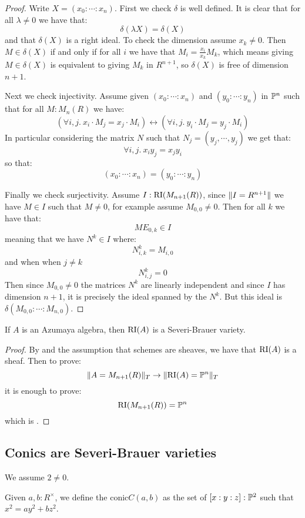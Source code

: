 \begin{proof}
Write $X=(x_0:\cdots:x_n)$. First we check $\delta$ is well defined. It is clear that for all $\lambda\not=0$ we have that:
\[\delta(\lambda X) = \delta(X)\]
and that $\delta(X)$ is a right ideal. To check the dimension assume $x_k\not=0$. Then $M\in\delta(X)$ if and only if for all $i$ we have that $M_i = \frac{x_i}{x_k} M_k$, which means giving $M\in\delta(X)$ is equivalent to giving $M_k$ in $R^{n+1}$, so $\delta(X)$ is free of dimension $n+1$.

Next we check injectivity. Assume given $(x_0:\cdots:x_n)$ and $(y_0:\cdots:y_n)$ in $\mathbb{P}^n$ such that for all $M:M_n(R)$ we have:
\[(\forall i,j.\ x_i\cdot M_j = x_j\cdot M_i) \leftrightarrow (\forall i,j.\ y_i\cdot M_j = y_j\cdot M_i)\]
In particular considering the matrix $N$ such that $N_j = (y_j,\cdots,y_j)$ we get that:
\[\forall i,j.\ x_iy_j=x_jy_i\] 
so that:
\[(x_0:\cdots:x_n) = (y_0:\cdots:y_n)\]

Finally we check surjectivity. Assume $I:\mathrm{RI}(M_{n+1}(R))$, since $\lVert I=R^{n+1} \rVert$ we have $M\in I$ such that $M\not=0$, for example assume $M_{0,0}\not=0$. Then for all $k$ we have that:
\[ME_{0,k}\in I\]
meaning that we have $N^k\in I$ where:
\[N^k_{i,k} = M_{i,0}\]
and when when $j\not=k$
\[N^k_{i,j} = 0\]
Then since $M_{0,0}\not=0$ the matrices $N^k$ are linearly independent and since $I$ has dimension $n+1$, it is precisely the ideal spanned by the $N^k$. But this ideal is $\delta(M_{0,0}:\cdots:M_{n,0})$.
\end{proof}

\begin{lemma}
If $A$ is an Azumaya algebra, then $\mathrm{RI}(A)$ is a Severi-Brauer variety.
\end{lemma}

\begin{proof}
By  and the assumption that schemes are sheaves, we have that $\mathrm{RI}(A)$ is a sheaf. Then to prove:
\[\lVert A=M_{n+1}(R) \rVert_T \to \lVert \mathrm{RI}(A)=\mathbb{P}^n \rVert_T\]
it is enough to prove:
\[\mathrm{RI}(M_{n+1}(R)) = \mathbb{P}^n\]
which is .
\end{proof}


\subsection{Conics are Severi-Brauer varieties}

We assume $2\not=0$.

\begin{definition}
Given $a,b:R^\times$, we define the conic$C(a,b)$ as the set of $[x:y:z]:\mathbb{P}^2$ such that $x^2=ay^2+bz^2$.
\end{definition}

